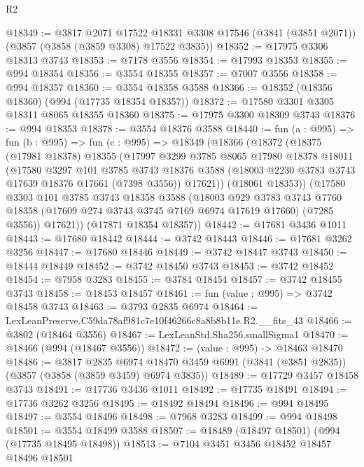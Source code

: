 \begin{lexlean}{R2}
\begin{coremodule}
@18349 := @3817
    @2071
    @17522
    @18331
    @3308
    @17546
    (@3841 (@3851 @2071))
    (@3857 (@3858 (@3859 @3308) @17522 @3835))
@18352 := @17975 @3306 @18313 @3743
@18353 := @7178 @3556
@18354 := @17993 @18353
@18355 := @994 @18354
@18356 := @3554 @18355
@18357 := @7007 @3556
@18358 := @994 @18357
@18360 := @3554 @18358 @3588
@18366 := @18352 (@18356 @18360) (@994 (@17735 @18354 @18357))
@18372 := @17580 @3301 @3305 @18311 @8065 @18355 @18360
@18375 := @17975 @3300 @18309 @3743
@18376 := @994 @18353
@18378 := @3554 @18376 @3588
@18440 := fun (a : @995) =>
  fun (b : @995) =>
  fun (c : @995) =>
  @18349
    (@18366
      (@18372
        (@18375
          (@17981 @18378)
          @18355
          (@17997
            @3299
            @3785
            @8065
            @17980
            @18378
            @18011
            (@17580
              @3297
              @101
              @3785
              @3743
              @18376
              @3588
              (@18003 @2230 @3783 @3743 @17639 @18376 @17661 (@7398 @3556))
              @17621))
          (@18061 @18353))
        (@17580
          @3303
          @101
          @3785
          @3743
          @18358
          @3588
          (@18003
            @929
            @3783
            @3743
            @7760
            @18358
            (@17609 @274 @3743 @3745 @7169 @6974 @17619 @17660)
            (@7285 @3556))
          @17621))
      (@17871 @18354 @18357))
@18442 := @17681 @3436 @1011
@18443 := @17680 @18442
@18444 := @3742 @18443
@18446 := @17681 @3262 @3256
@18447 := @17680 @18446
@18449 := @3742 @18447 @3743
@18450 := @18444 @18449
@18452 := @3742 @18450 @3743
@18453 := @3742 @18452
@18454 := @7958 @3283
@18455 := @3784 @18454
@18457 := @3742 @18455 @3743
@18458 := @18453 @18457
@18461 := fun (value : @995) => @3742 @18458 @3743
@18463 := @3793 @2835 @6974
@18464 := LexLeanPreserve.C59da78af981c7e10f46266c8a8b8b11e.R2.__fits_43
@18466 := @3802 (@18464 @3556)
@18467 := LexLeanStd.Sha256.smallSigma1
@18470 := @18466 (@994 (@18467 @3556))
@18472 := (value : @995) -> @18463 @18470
@18486 := @3817
    @2835
    @6974
    @18470
    @3459
    @6991
    (@3841 (@3851 @2835))
    (@3857 (@3858 (@3859 @3459) @6974 @3835))
@18489 := @17729 @3457 @18458 @3743
@18491 := @17736 @3436 @1011
@18492 := @17735 @18491
@18494 := @17736 @3262 @3256
@18495 := @18492 @18494
@18496 := @994 @18495
@18497 := @3554 @18496
@18498 := @7968 @3283
@18499 := @994 @18498
@18501 := @3554 @18499 @3588
@18507 := @18489 (@18497 @18501) (@994 (@17735 @18495 @18498))
@18513 := @7104 @3451 @3456 @18452 @18457 @18496 @18501

\end{coremodule}
\end{lexlean}
